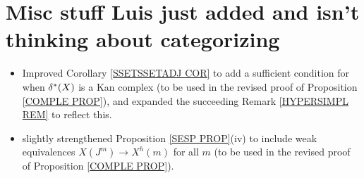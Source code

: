 \documentclass{article}
\begin{document}
\section{Misc stuff Luis just added and isn't thinking about categorizing}

\begin{itemize}

\item Improved Corollary \ref{SSETSSETADJ COR} to add a sufficient condition for when $\delta^{\**}(X)$ is a Kan complex (to be used in the revised proof of Proposition \ref{COMPLE PROP}), and expanded the succeeding Remark \ref{HYPERSIMPL REM} to reflect this.

\item slightly strengthened Proposition \ref{SESP PROP}(iv) to include weak equivalences $X(J^m) \to X^h(m)$ for all $m$ (to be used in the revised proof of Proposition \ref{COMPLE PROP}).

\end{itemize}


{}


\end{document}

